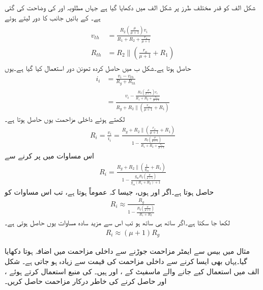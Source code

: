 شکل  الف کو قدر مختلف طرز پر  شکل  الف میں دکھایا گیا ہے جہاں مطلوبہ  اور  کی وضاحت کی گئی ہے۔ کے بائیں جانب کا  دور لیتے ہوئے
\begin{gather}
\begin{aligned}
v_{th}&=\frac{R_2 \left(\frac{\mu }{\mu+1} \right) v_i}{R_1+R_2+\frac{r_o}{\mu+1}}\\
R_{th}&=R_2 \mathbin{\|} \left(\frac{r_o}{\mu+1}+R_1 \right)
\end{aligned}
\end{gather}
حاصل ہوتا ہے۔شکل  ب میں حاصل کردہ تھونن دور استعمال کیا گیا ہے۔یوں
\begin{align*}
i_i&=\frac{v_i-v_{th}}{R_g+R_{th}}\\
&=\frac{v_i-\frac{R_2 \left(\frac{\mu }{\mu+1} \right) v_i}{R_1+R_2+\frac{r_o}{\mu+1}}}{R_g+R_2 \mathbin{\|} \left(\frac{r_o}{\mu+1}+R_1 \right)}
\end{align*}
لکھتے ہوئے داخلی مزاحمت  یوں حاصل ہوتا ہے۔
\begin{align}\label{مساوات_ماسفیٹ_تابع_مخارج_داخلی_مزاحمت_الف}
R_i=\frac{v_i}{i_i}=\frac{R_g+R_2 \mathbin{\|} \left(\frac{r_o}{\mu+1}+R_1 \right)}{1-\frac{R_2 \left(\frac{\mu }{\mu+1} \right)}{R_1+R_2+\frac{r_o}{\mu+1}}}
\end{align}
اس مساوات میں  پر کرنے سے
\begin{align}\label{مساوات_ماسفیٹ_تابع_مخارج_داخلی_مزاحمت_ب}
R_i=\frac{R_g+R_2 \mathbin{\|} \left(\frac{1}{g_m}+R_1 \right)}{1-\frac{g_m R_2 \left(\frac{\mu }{\mu+1} \right)}{g_m \left(R_1+R_2\right)+1}}
\end{align}
حاصل ہوتا ہے۔اگر  اور  ہوں، جیسا کہ عموماً ہوتا ہے، تب اس مساوات کو
\begin{align}\label{مساوات_ماسفیٹ_تابع_مخارج_داخلی_مزاحمت_پ}
R_i \approx \frac{R_g}{1-\frac{R_2 \left(\frac{\mu}{\mu+1} \right)}{R_1+R_2}}
\end{align}
لکھا جا سکتا ہے۔اگر ساتھ ہی ساتھ  ہو تب اس سے مزید سادہ مساوات یوں حاصل ہوتی ہے۔
\begin{align} \label{مساوات_ماسفیٹ_تابع_مخارج_داخلی_مزاحمت_ت}
R_i \approx \left(\mu+1 \right) R_g
\end{align}

مثال  میں  بیس سے ایمٹر مزاحمت جوڑنے سے داخلی مزاحمت میں اضافہ ہوتا دکھایا گیا۔یہاں بھی ایسا کرنے سے داخلی مزاحمت کی قیمت  سے زیادہ ہو جاتی ہے۔
شکل  الف میں استعمال کیے جانے والے ماسفیٹ کے
 ،  اور  ہیں۔ کی منبع استعمال کرتے ہوئے ،  اور  حاصل کرنے کی خاطر درکار مزاحمت حاصل کریں۔

